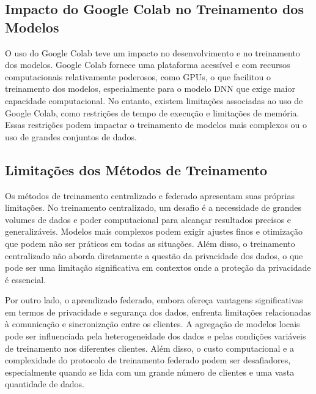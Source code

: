 \subsection{Impacto do Google Colab no Treinamento dos Modelos}

O uso do Google Colab teve um impacto no desenvolvimento e no treinamento dos modelos. Google Colab fornece uma plataforma acessível e com recursos computacionais relativamente poderosos, como GPUs, o que facilitou o treinamento dos modelos, especialmente para o modelo DNN que exige maior capacidade computacional. No entanto, existem limitações associadas ao uso de Google Colab, como restrições de tempo de execução e limitações de memória. Essas restrições podem impactar o treinamento de modelos mais complexos ou o uso de grandes conjuntos de dados.

\subsection{Limitações dos Métodos de Treinamento}

Os métodos de treinamento centralizado e federado apresentam suas próprias limitações. No treinamento centralizado, um desafio é a necessidade de grandes volumes de dados e poder computacional para alcançar resultados precisos e generalizáveis. Modelos mais complexos podem exigir ajustes finos e otimização que podem não ser práticos em todas as situações. Além disso, o treinamento centralizado não aborda diretamente a questão da privacidade dos dados, o que pode ser uma limitação significativa em contextos onde a proteção da privacidade é essencial.

Por outro lado, o aprendizado federado, embora ofereça vantagens significativas em termos de privacidade e segurança dos dados, enfrenta limitações relacionadas à comunicação e sincronização entre os clientes. A agregação de modelos locais pode ser influenciada pela heterogeneidade dos dados e pelas condições variáveis de treinamento nos diferentes clientes. Além disso, o custo computacional e a complexidade do protocolo de treinamento federado podem ser desafiadores, especialmente quando se lida com um grande número de clientes e uma vasta quantidade de dados.